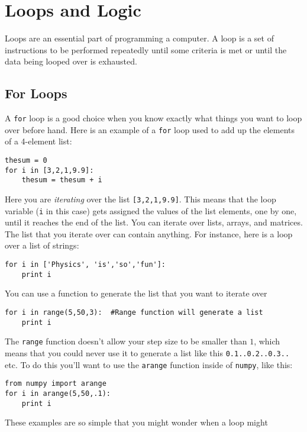 \chapter{Loops and Logic}
\label{chap:LoopsLogic}

Loops are an essential part of programming a computer. A loop is a set
of instructions to be performed repeatedly until some criteria is met
or until the data being looped over is exhausted.

\section{For Loops}
A \texttt{for} loop is a good choice when you know exactly what things you want
to loop over before hand.  Here is an example of a \texttt{for} loop
used to add up the elements of a 4-element list:
\begin{Verbatim}
thesum = 0
for i in [3,2,1,9.9]:
    thesum = thesum + i
\end{Verbatim} 
Here you are {\it iterating} over the list \texttt{[3,2,1,9.9]}.  This
means that the loop variable (\texttt{i} in this case) gets assigned
the values of the list elements, one by one, until it reaches the end
of the list.  You can iterate over lists, arrays, and
matrices.  The list
that you iterate over can contain anything.  For instance, here is a loop over a list of
strings:
\begin{Verbatim}
for i in ['Physics', 'is','so','fun']:
    print i
\end{Verbatim} 
You can use a function to generate the list that you want to iterate
over
\begin{Verbatim}
for i in range(5,50,3):  #Range function will generate a list
    print i
\end{Verbatim} 
The \texttt{range} function doesn't allow your step size to be smaller
than $1$, which means that you could never use it to generate a list
like this \texttt{0.1..0.2..0.3..} etc.  To do this you'll want to use the
\texttt{arange} function inside of \texttt{numpy}, like this:
\begin{Verbatim}
from numpy import arange
for i in arange(5,50,.1):
    print i
\end{Verbatim} 
These examples are so simple that you might wonder when a loop might
